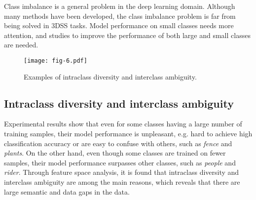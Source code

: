 \documentclass[journal]{IEEEtran}
\begin{document}
Class imbalance is a general problem in the deep learning domain. Although many methods have been developed, the class imbalance problem is far from being solved in 3DSS tasks. Model performance on small classes needs more attention, and studies to improve the performance of both large and small classes are needed. 




\begin{figure}[t]
	\centering
	\texttt{[image: fig-6.pdf]}
	\vspace{-3mm}
	\caption{Examples of intraclass diversity and interclass ambiguity.}
	\label{fig:6}
	\vspace{-4mm}
\end{figure}
     
\subsection{Intraclass diversity and interclass ambiguity}

Experimental results show that even for some classes having a large number of training samples, their model performance is unpleasant, e.g. hard to achieve high classification accuracy or are easy to confuse with others, such as \textit{fence} and \textit{plants}. On the other hand, even though some classes are trained on fewer samples, their model performance surpasses other classes, such as \textit{people} and \textit{rider}. Through feature space analysis, it is found that intraclass diversity and interclass ambiguity are among the main reasons, which reveals that there are large semantic and data gaps in the data. 
\end{document}

